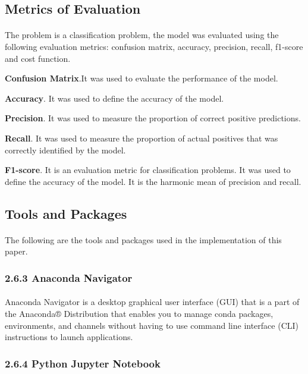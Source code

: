 \documentclass[runningheads]{llncs}
\begin{document}
\subsection{Metrics of Evaluation}
\paragraph{}
The problem is a classification problem, the model was evaluated using the following evaluation metrics: confusion matrix, accuracy, precision, recall, f1-score and cost function.

\textbf{Confusion Matrix}.It was used to evaluate the performance of the model.

\textbf{Accuracy}. It was  used to define the accuracy of the model.

\textbf{Precision}. It was  used to measure the proportion of correct positive predictions.

\textbf{Recall}. It was  used to measure the proportion of actual positives that was correctly identified by the model.

\textbf{F1-score}. It is an evaluation metric for classification problems. It was used to define the accuracy of the model. It is the harmonic mean of precision and recall.

\subsection{Tools and Packages}
\paragraph{} 
The following are the tools and packages used in the implementation of this paper.

\subsubsection{2.6.3 Anaconda Navigator}
\paragraph{}
Anaconda Navigator is a desktop graphical user interface (GUI) that is a part of the Anaconda® Distribution that enables you to manage conda packages, environments, and channels without having to use command line interface (CLI) instructions to launch applications.

\subsubsection{2.6.4 Python Jupyter Notebook}
\end{document}
